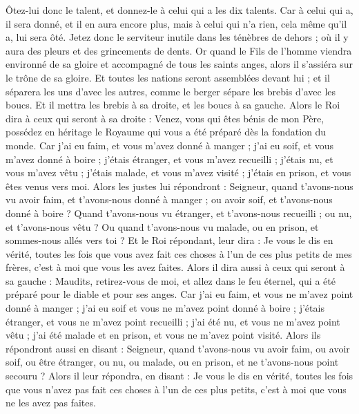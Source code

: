 \begin{multicols}{2}
Ôtez-lui donc le talent, et donnez-le à celui qui a les dix talents.
Car à celui qui a, il sera donné, et il en aura encore plus, mais à celui qui n'a rien, cela même qu'il a, lui sera ôté.
Jetez donc le serviteur inutile dans les ténèbres de dehors ; où il y aura des pleurs et des grincements de dents.
Or quand le Fils de l'homme viendra environné de sa gloire et accompagné de tous les saints anges, alors il s'assiéra sur le trône de sa gloire.
Et toutes les nations seront assemblées devant lui ; et il séparera les uns d'avec les autres, comme le berger sépare les brebis d'avec les boucs.
Et il mettra les brebis à sa droite, et les boucs à sa gauche.
Alors le Roi dira à ceux qui seront à sa droite : Venez, vous qui êtes bénis de mon Père, possédez en héritage le Royaume qui vous a été préparé dès la fondation du monde.
Car j'ai eu faim, et vous m'avez donné à manger ; j'ai eu soif, et vous m'avez donné à boire ; j'étais étranger, et vous m'avez recueilli ;
j'étais nu, et vous m'avez vêtu ; j'étais malade, et vous m'avez visité ; j'étais en prison, et vous êtes venus vers moi.
Alors les justes lui répondront : Seigneur, quand t'avons-nous vu avoir faim, et t'avons-nous donné à manger ; ou avoir soif, et t'avons-nous donné à boire ?
Quand t'avons-nous vu étranger, et t'avons-nous recueilli ; ou nu, et t'avons-nous vêtu ?
Ou quand t'avons-nous vu malade, ou en prison, et sommes-nous allés vers toi ?
Et le Roi répondant, leur dira : Je vous le dis en vérité, toutes les fois que vous avez fait ces choses à l'un de ces plus petits de mes frères, c'est à moi que vous les avez faites.
Alors il dira aussi à ceux qui seront à sa gauche : Maudits, retirez-vous de moi, et allez dans le feu éternel, qui a été préparé pour le diable et pour ses anges.
Car j'ai eu faim, et vous ne m'avez point donné à manger ; j'ai eu soif et vous ne m'avez point donné à boire ;
j'étais étranger, et vous ne m'avez point recueilli ; j'ai été nu, et vous ne m'avez point vêtu ; j'ai été malade et en prison, et vous ne m'avez point visité.
Alors ils répondront aussi en disant : Seigneur, quand t'avons-nous vu avoir faim, ou avoir soif, ou être étranger, ou nu, ou malade, ou en prison, et ne t'avons-nous point secouru ?
Alors il leur répondra, en disant : Je vous le dis en vérité, toutes les fois que vous n'avez pas fait ces choses à l'un de ces plus petits, c'est à moi que vous ne les avez pas faites.

\end{multicols}
